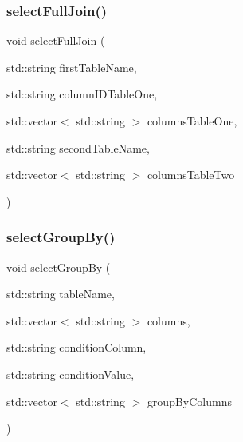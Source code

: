 \mbox{\label{sqllib_8hpp_a41392b97718c999af4867dc0c62ade0c}} 
\subsubsection{select\+Full\+Join()}
{\footnotesize\ttfamily void select\+Full\+Join (\begin{DoxyParamCaption}\item[{std\+::string}]{first\+Table\+Name,  }\item[{std\+::string}]{column\+I\+D\+Table\+One,  }\item[{std\+::vector$<$ std\+::string $>$}]{columns\+Table\+One,  }\item[{std\+::string}]{second\+Table\+Name,  }\item[{std\+::vector$<$ std\+::string $>$}]{columns\+Table\+Two }\end{DoxyParamCaption})}

\mbox{\label{sqllib_8hpp_a54c70afd3e6ad75085ddf6aff29abe87}} 
\subsubsection{select\+Group\+By()}
{\footnotesize\ttfamily void select\+Group\+By (\begin{DoxyParamCaption}\item[{std\+::string}]{table\+Name,  }\item[{std\+::vector$<$ std\+::string $>$}]{columns,  }\item[{std\+::string}]{condition\+Column,  }\item[{std\+::string}]{condition\+Value,  }\item[{std\+::vector$<$ std\+::string $>$}]{group\+By\+Columns }\end{DoxyParamCaption})}

\mbox{\label{sqllib_8hpp_a5e60ce2e53b91725f89c66539e5bd73d}} 
